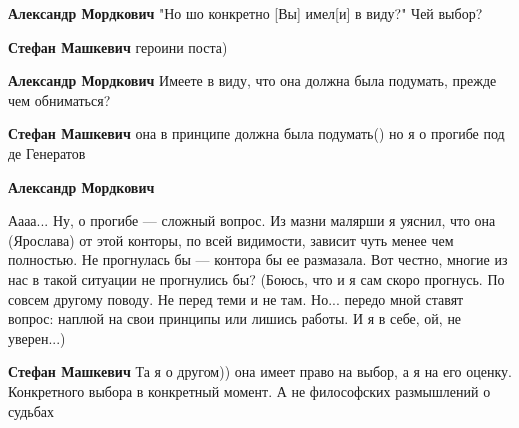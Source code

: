 \begin{itemize}
\begin{itemize}

\textbf{Александр Мордкович} "Но шо конкретно [Вы] имел[и] в виду?"
Чей выбор?

 
\textbf{Стефан Машкевич} героини поста)


\textbf{Александр Мордкович} Имеете в виду, что она должна была подумать, прежде чем обниматься?

 
\textbf{Стефан Машкевич} она в принципе должна была подумать() но я о прогибе под де Генератов

 
\textbf{Александр Мордкович} 

\obeycr
Аааа...
Ну, о прогибе — сложный вопрос.
Из мазни малярши я уяснил, что она (Ярослава) от этой конторы, по всей видимости, зависит чуть менее чем полностью.
Не прогнулась бы — контора бы ее размазала.
Вот честно, многие из нас в такой ситуации не прогнулись бы?
(Боюсь, что и я сам скоро прогнусь. По совсем другому поводу. Не перед теми и не там. Но... передо мной ставят вопрос: наплюй на свои принципы или лишись работы. И я в себе, ой, не уверен...)
\restorecr


 
\textbf{Стефан Машкевич} Та я о другом)) она имеет право на выбор, а я на его оценку. Конкретного выбора в конкретный момент. А не философских размышлений о судьбах

 

\end{itemize}
\end{itemize}
